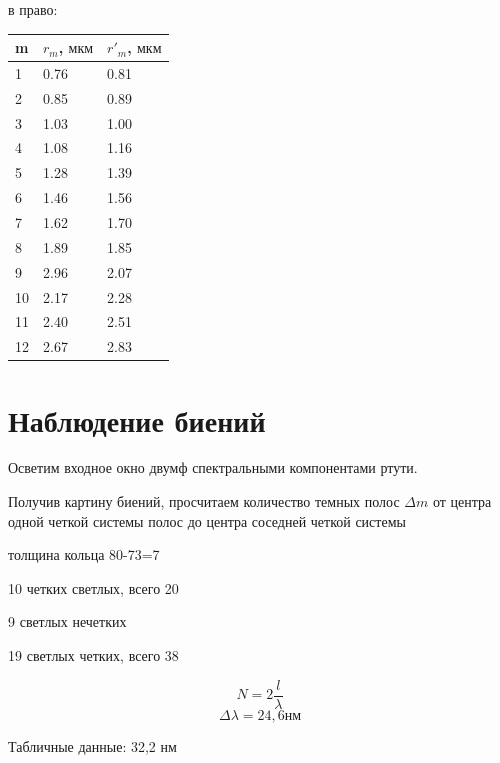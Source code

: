 \documentclass[a4paper]{article}
\begin{document}
в право:
\begin{table}[h]
    \centering
    \begin{tabular}{|l|l|l|} %
        \hline
        \textbf{m} & \textbf{$r_m$, $\text{мкм}$} &\textbf{$r'_m$, $\text{мкм}$} \\
        \hline
        1 & 0.76 & 0.81 \\
        \hline
        2 & 0.85 & 0.89\\
        \hline
        3 & 1.03  & 1.00\\
        \hline
        4 & 1.08 &1.16 \\
        \hline
        5 &1.28 &1.39\\
        \hline
        6 &1.46 &1.56\\
        \hline
        7 & 1.62 &1.70\\
        \hline
        8 & 1.89 &1.85\\
        \hline
        9 & 2.96 &2.07\\
        \hline
         10& 2.17 &2.28\\
         \hline
          11& 2.40 &2.51\\
          \hline
         12& 2.67 &2.83\\
        \hline
    \end{tabular}
\end{table}

\newpage

\section*{Наблюдение биений}

Осветим входное окно двумф спектральными компонентами ртути.\par

Получив картину биений, просчитаем количество темных полос $\varDelta m$ от центра
одной четкой системы полос до центра соседней четкой системы

толщина кольца 80-73=7 \par

10 четких светлых, всего 20 \par
9 светлых нечетких \par
19 светлых четких, всего 38 \par
\[N = 2 \frac{l}{\lambda}\]
\[\Delta \lambda = 24,6 \text{нм}\]

Табличные данные: 32,2 нм
\end{document}
